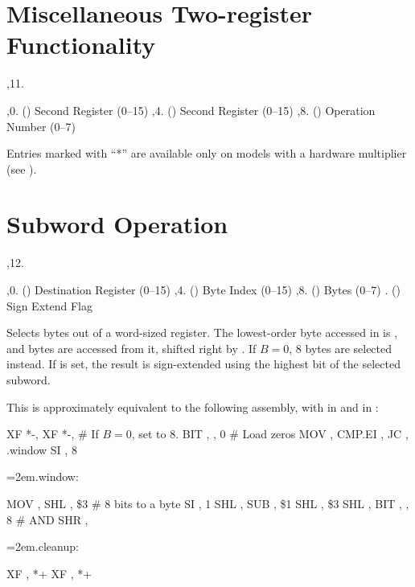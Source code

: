 \section{Miscellaneous Two-register Functionality}

\noindent\ins{},11. 

\li \ins{},0. () Second Register (0--15)
\li \ins{},4. () Second Register (0--15)
\li \ins{},8. () Operation Number (0--7)

\bigskip
{
	\offinterlineskip
}
\bigskip

Entries marked with ``*'' are available only on models with a hardware
multiplier (see ).

\section{Subword Operation}

\noindent\ins{},12. 

\li \ins{},0. () Destination Register (0--15)
\li \ins{},4. () Byte Index (0--15)
\li \ins{},8. () Bytes (0--7)
\li \ins{}. () Sign Extend Flag

Selects bytes out of a word-sized register. The lowest-order byte accessed in
 is , and  bytes are accessed from it, shifted right by
. If $B = 0$, 8 bytes are selected instead. If  is set, the
result is sign-extended using the highest bit of the selected subword.

This is approximately equivalent to the following assembly, with  in
 and  in :

\startblock
	XF *-, 
	XF *-, 
	\# If $B = 0$, set  to 8.
	BIT , , 0  \# Load zeros
	MOV , 
	CMP.EI , 
	JC , .window
	SI , 8
{\leftskip=2em.window:\par}
	MOV , 
	SHL , \$3  \# 8 bits to a byte
	SI , 1
	SHL , 
	SUB , \$1
	SHL , \$3
	SHL , 
	BIT , , 8  \# AND
	SHR , 
{\leftskip=2em.cleanup:\par}
	XF , *+
	XF , *+
\endblock

